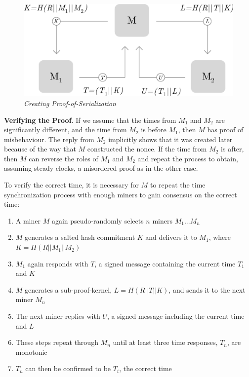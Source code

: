 \documentclass[10pt, nonatbib, nocopyrightspace, reprint]{sigplanconf}
\begin{document}
\begin{figure}[ht]
    \begin{center}
          \includegraphics[width=\columnwidth]{serialization.eps}
          \caption{\emph{Creating Proof-of-Serialization}}
          \label{fig:serialization}
     \end{center}
\end{figure}

\textbf{Verifying the Proof}. If we assume that the times from $M_1$ and $M_2$ are significantly different, and the time from $M_2$ is before $M_1$, then $M$ has proof of misbehaviour. The reply from $M_2$ implicitly shows that it was created later because of the way that $M$ constructed the nonce. If the time from $M_2$ is after, then $M$ can reverse the roles of $M_1$ and $M_2$ and repeat the process to obtain, assuming steady clocks, a misordered proof as in the other case.

To verify the correct time, it is necessary for $M$ to repeat the time synchronization process with enough miners to gain consensus on the correct time:

\begin{enumerate}
    \item A miner $M$ again pseudo-randomly selects $n$ miners $M_1$...$M_n$
    \item $M$ generates a salted hash commitment $K$ and delivers it to $M_1$, where ${K = H\left(R || M_1 || M_2\right)}$
    \item $M_1$ again responds with $T$, a signed message containing the current time $T_1$ and $K$
    \item $M$ generates a sub-proof-kernel, $L = H\left(R || T || K\right)$, and sends it to the next miner $M_n$
    \item The next miner replies with $U$, a signed message including the current time and $L$
    \item These steps repeat through $M_n$ until at least three time responses, $T_n$, are monotonic
    \item $T_n$ can then be confirmed to be $T_t$, the correct time
\end{enumerate}
\end{document}
